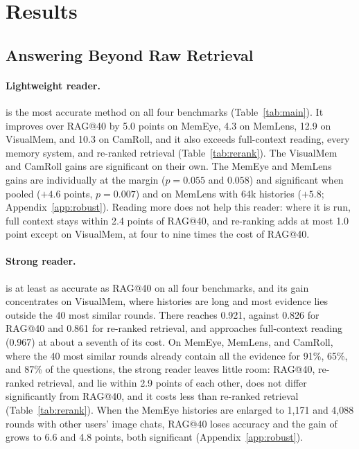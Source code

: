 \section{Results}
\label{sec:results}

\subsection{Answering Beyond Raw Retrieval}
\label{sec:res-main}



\paragraph{Lightweight reader.} \vgs{} is the most accurate method on all four benchmarks (Table~\ref{tab:main}). It improves over RAG@40 by 5.0 points on MemEye, 4.3 on MemLens, 12.9 on VisualMem, and 10.3 on CamRoll, and it also exceeds full-context reading, every memory system, and re-ranked retrieval (Table~\ref{tab:rerank}). The VisualMem and CamRoll gains are significant on their own. The MemEye and MemLens gains are individually at the margin ($p{=}0.055$ and $0.058$) and significant when pooled ($+4.6$ points, $p{=}0.007$) and on MemLens with 64k histories ($+5.8$; Appendix~\ref{app:robust}). Reading more does not help this reader: where it is run, full context stays within 2.4 points of RAG@40, and re-ranking adds at most 1.0 point except on VisualMem, at four to nine times the cost of RAG@40.

\paragraph{Strong reader.} \vgs{} is at least as accurate as RAG@40 on all four benchmarks, and its gain concentrates on VisualMem, where histories are long and most evidence lies outside the 40 most similar rounds. There \vgs{} reaches 0.921, against 0.826 for RAG@40 and 0.861 for re-ranked retrieval, and approaches full-context reading (0.967) at about a seventh of its cost. On MemEye, MemLens, and CamRoll, where the 40 most similar rounds already contain all the evidence for 91\%, 65\%, and 87\% of the questions, the strong reader leaves little room: RAG@40, re-ranked retrieval, and \vgs{} lie within 2.9 points of each other, \vgs{} does not differ significantly from RAG@40, and it costs less than re-ranked retrieval (Table~\ref{tab:rerank}). When the MemEye histories are enlarged to 1,171 and 4,088 rounds with other users' image chats, RAG@40 loses accuracy and the gain of \vgs{} grows to 6.6 and 4.8 points, both significant (Appendix~\ref{app:robust}).

